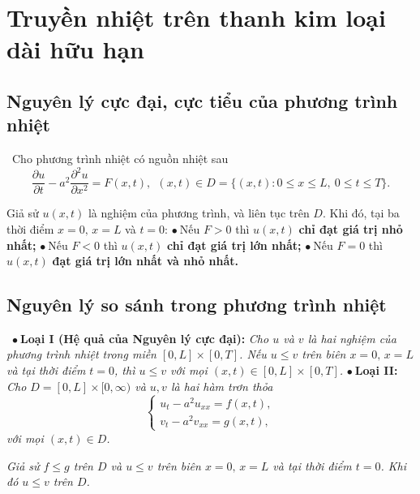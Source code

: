 \documentclass[10pt, a4paper]{article}
\begin{document}
	\section{Truyền nhiệt trên thanh kim loại dài hữu hạn}
	\subsection{Nguyên lý cực đại, cực tiểu của phương trình nhiệt}
	\vspace{2mm}
	\quad\,\,\,Cho phương trình nhiệt có nguồn nhiệt sau $$\dfrac{\partial u}{\partial t}-a^2\dfrac{\partial^2u}{\partial x^2}=F(x,t),~~(x,t)\in D=\{(x,t):0\le x\le L,~0\le t\le T\}.$$
	
	Giả sử $u(x,t)$ là nghiệm của phương trình, và liên tục trên $D$. Khi đó, tại ba thời điểm $x=0,\,x=L$ và $t=0$:
	\vskip7pt
	$\bullet~$Nếu $F>0$ thì $u(x,t)$ \textbf{\color{red}chỉ đạt giá trị nhỏ nhất;}
	\vskip7pt
	$\bullet~$Nếu $F<0$ thì $u(x,t)$ \textbf{\color{red}chỉ đạt giá trị lớn nhất;}
	\vskip7pt
	$\bullet~$Nếu $F=0$ thì $u(x,t)$ \textbf{\color{red}đạt giá trị lớn nhất và nhỏ nhất.}
	\subsection{Nguyên lý so sánh trong phương trình nhiệt}
	\vspace{2mm}
	\quad\,\,\,$\bullet~$\textbf{Loại I (Hệ quả của Nguyên lý cực đại):} \textit{Cho $u$ và $v$ là hai nghiệm của phương trình nhiệt trong miền $[0,L]\times[0,T]$. Nếu $u\le v$ trên biên $x=0,\,x=L$ và tại thời điểm $t=0$, thì $u\le v$ với mọi $(x,t)\in[0,L]\times[0,T]$.}
	\vskip7pt
	$\bullet~$\textbf{Loại II:} \textit{Cho $D=[0,L]\times[0,\infty)$ và $u,v$ là hai hàm trơn thỏa} $$\begin{cases}
		u_t-a^2u_{xx}=f(x,t),\\
		v_t-a^2v_{xx}=g(x,t),
	\end{cases}$$
	\textit{với mọi $(x,t)\in D$.}
	\begin{flushleft}
		\textit{Giả sử $f\le g$ trên $D$ và $u\le v$ trên biên $x=0,\,x=L$ và tại thời điểm $t=0$. Khi đó $u\le v$ trên $D$.}
	\end{flushleft}
	
\end{document}

